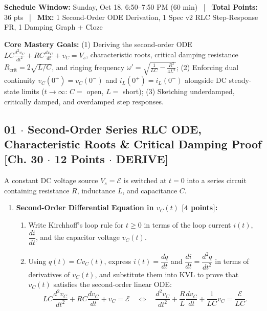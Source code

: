 \documentclass[10pt,letterpaper]{article}
\begin{document}
{{{  \textbf{Schedule Window:} Sunday, Oct 18, 6:50--7:50 PM (60 min) ~|~
  \textbf{Total Points:} 36 pts ~|~
  \textbf{Mix:} 1 Second-Order ODE Derivation, 1 Spec v2 RLC Step-Response FR, 1 Damping Graph + Cloze



  \textbf{Core Mastery Goals:} (1) Deriving the second-order ODE $LC\frac{d^2 v_C}{dt^2} + RC\frac{dv_C}{dt} + v_C = V_s$, characteristic roots, critical damping resistance $R_{\text{crit}} = 2\sqrt{L/C}$, and ringing frequency $\omega' = \sqrt{\frac{1}{LC} - \frac{R^2}{4L^2}}$; (2) Enforcing dual continuity $v_C(0^+)=v_C(0^-)$ and $i_L(0^+)=i_L(0^-)$ alongside DC steady-state limits ($t \to \infty$: $C =$ open, $L =$ short); (3) Sketching underdamped, critically damped, and overdamped step responses.


\subsection*{01 $\cdot$ Second-Order Series RLC ODE, Characteristic Roots \& Critical Damping Proof \hfill [Ch. 30 $\cdot$ 12 Points $\cdot$ DERIVE]}

A constant DC voltage source $V_s = \mathcal{E}$ is switched at $t = 0$ into a series circuit containing resistance $R$, inductance $L$, and capacitance $C$.

\begin{enumerate}
  \item \textbf{Second-Order Differential Equation in $v_C(t)$ [4 points]:}
    \begin{enumerate}
      \item Write Kirchhoff's loop rule for $t \ge 0$ in terms of the loop current $i(t)$, $\dfrac{di}{dt}$, and the capacitor voltage $v_C(t)$.
      \item Using $q(t) = C v_C(t)$, express $i(t) = \dfrac{dq}{dt}$ and $\dfrac{di}{dt} = \dfrac{d^2 q}{dt^2}$ in terms of derivatives of $v_C(t)$, and substitute them into KVL to prove that $v_C(t)$ satisfies the second-order linear ODE:
      $$LC\frac{d^2 v_C}{dt^2} + RC\frac{dv_C}{dt} + v_C = \mathcal{E} \quad \Longleftrightarrow \quad \frac{d^2 v_C}{dt^2} + \frac{R}{L}\frac{dv_C}{dt} + \frac{1}{LC}v_C = \frac{\mathcal{E}}{LC}.$$
    \end{enumerate}
  

\end{enumerate}}}}
\end{document}

